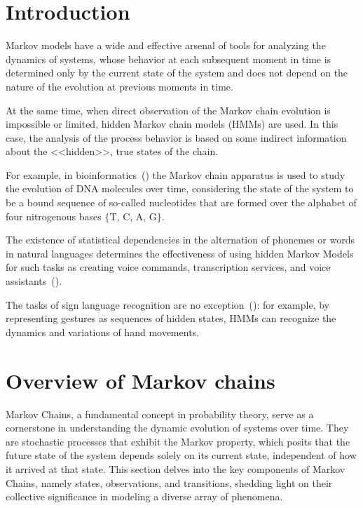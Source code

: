 \documentclass{englishreport}
\begin{document}
\section*{Introduction}

Markov models have a wide and effective arsenal of tools for analyzing the dynamics of systems, whose behavior at each subsequent moment in time is determined only by the current state of the system and does not depend on the nature of the evolution at previous moments in time. 

At the same time, when direct observation of the Markov chain evolution is impossible or limited, hidden Markov chain models (HMMs) are used. In this case, the analysis of the process behavior is based on some indirect information about the <<hidden>>, true states of the chain. 

For example, in bioinformatics~(\cite[chapter 9]{Koski2001}) the Markov chain apparatus is used to study the evolution of DNA molecules over time, considering the state of the system to be a bound sequence of so-called nucleotides that are formed over the alphabet of four nitrogenous bases $\{\text{T, C, A, G}\}$.  

The existence of statistical dependencies in the alternation of phonemes or words in natural languages determines the effectiveness of using hidden Markov Models for such tasks as creating voice commands, transcription services, and voice assistants~(\cite{Rabiner1989}).

The tasks of sign language recognition are no exception~(\cite{Chaaraoui2013}): for example, by representing gestures as sequences of hidden states, HMMs can recognize the dynamics and variations of hand movements.

\newpage
\section{Overview of Markov chains}

Markov Chains, a fundamental concept in probability theory, serve as a cornerstone in understanding the dynamic evolution of systems over time. They are stochastic processes that exhibit the Markov property, which posits that the future state of the system depends solely on its current state, independent of how it arrived at that state. This section delves into the key components of Markov Chains, namely states, observations, and transitions, shedding light on their collective significance in modeling a diverse array of phenomena.
\end{document}
